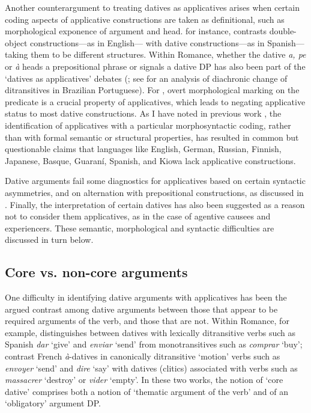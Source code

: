\documentclass[output=paper,colorlinks,citecolor=brown,nonflat]{./langscibook}
\begin{document}
Another counterargument to treating datives as applicatives arises when certain coding aspects of applicative constructions are taken as definitional, such as morphological exponence of argument and head. \citet{Snyder1995} for instance, contrasts double-object constructions—as in English— with dative constructions—as in Spanish— taking them to be different structures. Within Romance, whether the dative \textit{a, pe} or \textit{à} heads a prepositional phrase or signals a dative DP has also been part of the ‘datives as applicatives’ debates (; see  for an analysis of diachronic change of ditransitives in Brazilian Portuguese). For \citet{Polinsky2013}, overt morphological marking on the predicate is a crucial property of applicatives, which leads to negating applicative status to most dative constructions. As I have noted in previous work \citep[131]{Cuervo2015Chapter}, the identification of applicatives with a particular morphosyntactic coding, rather than with formal semantic or structural properties, has resulted in common but questionable claims that languages like English, German, Russian, Finnish, Japanese, Basque, Guaraní, Spanish, and Kiowa lack applicative constructions.

Dative arguments fail some diagnostics for applicatives based on certain syntactic asymmetries, and on alternation with prepositional constructions, as discussed in . Finally, the interpretation of certain datives has also been suggested as a reason not to consider them applicatives, as in the case of agentive causees \citep{Tubino2012} and experiencers.  These semantic, morphological and syntactic difficulties are discussed in turn below. 

\subsection{Core vs. non-core arguments}\label{sec:cuervo:2.1}

One difficulty in identifying dative arguments with applicatives has been the argued contrast among dative arguments between those that appear to be required arguments of the verb, and those that are not. Within Romance, for example, \citet{Pujalte2009} distinguishes between datives with lexically ditransitive verbs such as Spanish \textit{dar} ‘give’ and \textit{enviar} ‘send’ from monotransitives such as \textit{comprar} ‘buy’; \citet{BonehNash2012} contrast French \textit{à}-datives in canonically ditransitive ‘motion’ verbs such as \textit{envoyer} ‘send’ and \textit{dire} ‘say’ with datives (clitics) associated with verbs such as \textit{massacrer} ‘destroy’ or \textit{vider} ‘empty’. In these two works, the notion of ‘core dative’ comprises both a notion of ‘thematic argument of the verb’ and of an ‘obligatory’ argument DP.  
\end{document}
